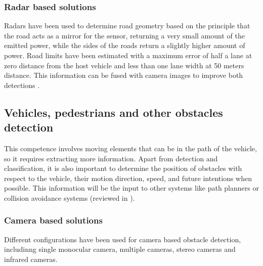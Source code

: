 
\subsubsection{Radar based solutions}
Radars have been used to determine road geometry based on the principle that the
road acts as a mirror for the sensor, returning a very small amount of the 
emitted power, while the sides of the roads return a slightly higher 
amount of power. Road limits have been estimated with a
maximum error of half a lane at zero distance from the host vehicle and less 
than one lane width at 50 meters distance. This information can be fused with
camera images to improve both detections 
\cite{kaliyaperumal2001algorithm, ma2000simultaneous, Janda2013}.

\subsection{Vehicles, pedestrians and other obstacles detection}
This competence involves moving elements that can be in the path of the 
vehicle, so it requires extracting more information. Apart from detection and 
classification, it is also important to determine the position of obstacles 
with respect to the vehicle, their motion direction, speed, and 
future intentions when possible. 
This information will be the input to other systems like path planners 
or collision avoidance systems (reviewed in \cite{mukhtar2015vehicle}).

\subsubsection{Camera based solutions}
Different configurations have been used for camera based obstacle detection, 
includinng single monocular camera, multiple cameras, stereo cameras and 
infrared cameras.

